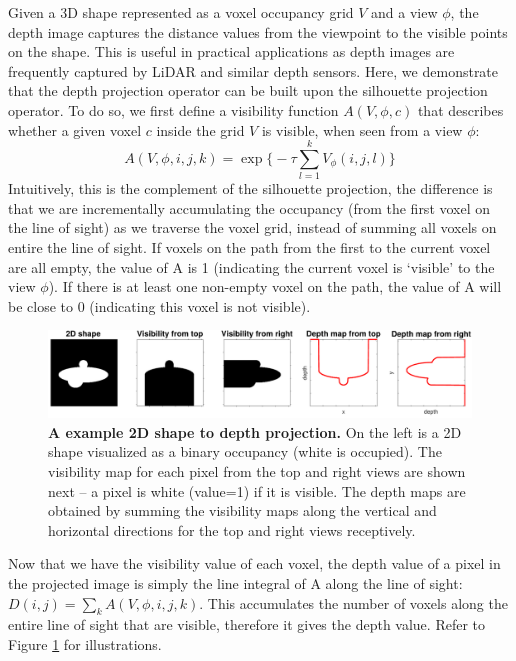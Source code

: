 Given a 3D shape represented as a voxel occupancy grid $V$ and a view $\phi$, the depth image captures the distance values from the viewpoint to the visible points on the shape. This is  useful in practical applications as depth images are frequently captured by LiDAR and similar depth sensors.
Here, we demonstrate that the depth projection operator can be built upon the silhouette projection operator. To do so, we first define a visibility function $A(V, \phi, c)$ that describes whether a given voxel $c$ inside the grid $V$ is visible, when seen from a view $\phi$:
\begin{equation}
A(V, \phi, i, j, k) = \exp\bigg\{-\tau \sum_{l=1}^k V_\phi(i,j,l) \bigg\}
\end{equation}
Intuitively, this is the complement of the silhouette projection, the difference is that we are incrementally accumulating the occupancy (from the first voxel on the line of sight) as we traverse the voxel grid, instead of summing all voxels on entire the line of sight. If voxels on the path from the first to the current voxel are all empty, the value of A is 1 (indicating the current voxel is `visible' to the view $\phi$). If there is at least one non-empty voxel on the path, the value of A will be close to 0 (indicating this voxel is not visible).

\begin{figure}
\centering
\includegraphics[width=0.9\linewidth]{dsp/figs/im2depth.pdf}
\vspace{-15pt}
\caption{\small\label{fig:im2depth}\textbf{A example 2D shape to depth
    projection.} On the left is a 2D shape visualized as a binary
  occupancy (white is occupied). The visibility map
  for each pixel from the top and right views are shown next -- a
  pixel is white (value=1) if it is visible. The depth maps are
  obtained by summing the visibility maps along the vertical and
  horizontal directions for the top and right views receptively.}
\vspace{-5pt}
\end{figure}

Now that we have the visibility value of each voxel, the depth value of a pixel in the projected image is simply the line integral of A along the line of sight: $D(i,j)=\sum_{k}A(V,\phi,i,j,k)$. This accumulates the number of voxels along the entire line of sight that are visible, therefore it gives the depth value. Refer to Figure \ref{fig:im2depth} for illustrations.

